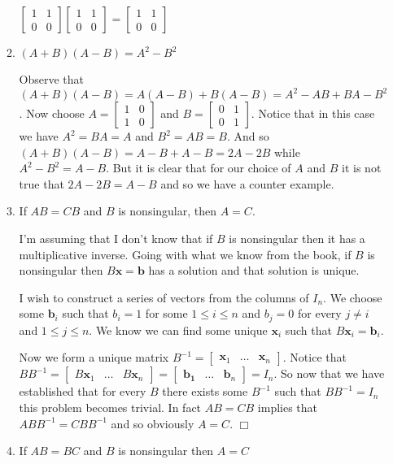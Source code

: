 \documentclass[letterpaper]{article}
\begin{document}
\begin{enumerate}
\begin{enumerate}
  $\displaystyle \left[\begin{array}{cc}1&1\\0&0\end{array}\right]
  \left[\begin{array}{cc}1&1\\0&0\end{array}\right]=
  \left[\begin{array}{cc}1&1\\0&0\end{array}\right]$
  \item
  $(A+B)(A-B)=A^2-B^2$

  Observe that $(A+B)(A-B)=A(A-B)+B(A-B)=A^2-AB+BA-B^2$. Now choose $A=\left[\begin{array}{cc}1&0\\1&0\end{array}\right]$ and $B=\left[\begin{array}{cc}0&1\\0&1\end{array}\right]$. Notice that in this case we have $A^2=BA=A$ and $B^2=AB=B$. And so $(A+B)(A-B)=A-B+A-B=2A-2B$ while $A^2-B^2=A-B$. But it is clear that for our choice of $A$ and $B$ it is not true that $2A-2B=A-B$ and so we have a counter example.
  \item
  If $AB=CB$ and $B$ is nonsingular, then $A=C$.

  I'm assuming that I don't know that if $B$ is nonsingular then it has a multiplicative inverse.
  Going with what we know from the book, if $B$ is nonsingular then $B\mathbf{x}=\mathbf{b}$ has a solution and that solution is unique.

  I wish to construct a series of vectors from the columns of $I_n$. We choose some $\mathbf{b}_i$ such that $b_i=1$ for some $1\le i\le n$ and $b_j=0$ for every $j\ne i$ and $1\le j\le n$.
  We know we can find some unique $\mathbf{x}_i$ such that $B\mathbf{x}_i=\mathbf{b}_i$.

  Now we form a unique matrix $B^{-1}=\left[\begin{array}{ccc}\mathbf{x}_1&\dots&\mathbf{x}_n\end{array}\right]$. Notice that $BB^{-1}=\left[\begin{array}{cccc}B\mathbf{x}_1&\dots&B\mathbf{x}_n\end{array}\right]=\left[\begin{array}{ccc}\mathbf{b_1}&\dots&\mathbf{b}_n\end{array}\right]=I_n$. So now that we have established that for every $B$ there exists some $B^{-1}$ such that $BB^{-1}=I_n$ this problem becomes trivial. In fact $AB=CB$ implies that $ABB^{-1}=CBB^{-1}$ and so obviously $A=C$.
  $\Box$
  \item
  If $AB=BC$ and $B$ is nonsingular then $A=C$


\end{enumerate}
\end{enumerate}
\end{document}
